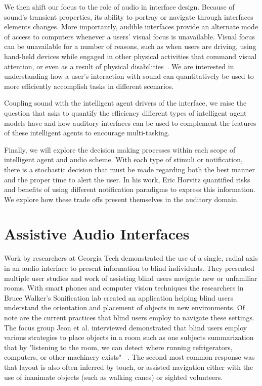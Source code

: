 We then shift our focus to the role of audio in interface design.  Because of
sound's transient properties, its ability to portray or navigate through
interfaces elements changes.  More importantly, audible interfaces provide an
alternate mode of access to computers whenever a users’ visual focus is unavailable.
Visual focus can be unavailable for a number of reasons, such as when users are
driving, using hand-held devices while engaged in other physical activities that
command visual attention, or even as a result of physical disabilities~\cite{
michelis2008disappearing}. We are interested in understanding how a user's
interaction with sound can quantitatively be used to more efficiently accomplish
tasks in different scenarios.

Coupling sound with the intelligent agent drivers of the interface,  we raise
the question that asks to quantify the efficiency different types of intelligent
agent models have and how auditory interfaces can be used to complement the features
of these intelligent agents to encourage multi-tasking.

Finally, we will explore the decision making processes within each scope of
intelligent agent and audio scheme. With each type of stimuli or notification,
there is a stochastic decision that must be made regarding both the best manner
and the proper time to alert the user. In his work, Eric Horvitz quantified risks
and benefits of using different notification paradigms to express this
information. We explore how these trade offs present themselves in the auditory domain.




\section{                 Assistive Audio Interfaces                           }

Work by researchers at Georgia Tech demonstrated the use of a single, radial axis
in an audio interface to present information to blind individuals. They presented
multiple user studies and work of assisting blind users navigate new or unfamiliar
rooms.  With smart phones and computer vision techniques the researchers in
Bruce Walker's Sonification lab created an application helping blind users understand
the orientation and placement of objects in new environments. Of note are the
current practices that blind users employ to navigate these settings. The focus group
Jeon et al. interviewed demonstrated that blind users employ
various strategies to place objects in a room such as one subjects summarization
that by "listening to the room, we can detect where running refrigerators,
computers, or other machinery exists" ~\cite{jeon2012listen2droom}. The second
most common response was that layout is also often inferred by touch, or assisted
navigation either with the use of inanimate objects (such as walking canes)
or sighted volunteers.

